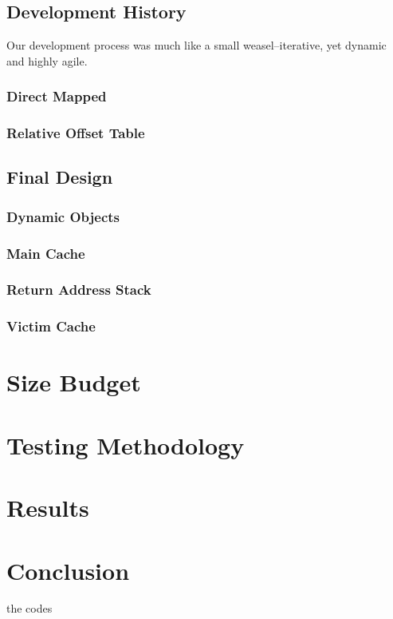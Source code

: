 \documentclass[twocolumn]{article}
\begin{document}
\subsection{Development History}
Our development process was much like a small weasel--iterative, yet dynamic and highly agile. 

\subsubsection{Direct Mapped}
\subsubsection{Relative Offset Table}
\subsection{Final Design}
\subsubsection{Dynamic Objects}
\subsubsection{Main Cache}
\subsubsection{Return Address Stack}
\subsubsection{Victim Cache}
\section{Size Budget}
\section{Testing Methodology}
\section{Results}
\section{Conclusion}
\appendix
the codes
\end{document}
